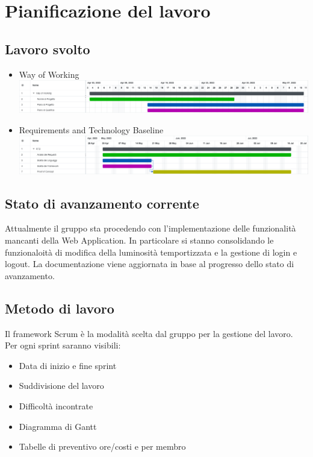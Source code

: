 \documentclass[a4paper, 12pt]{article}
\begin{document}
\newpage
\section{Pianificazione del lavoro}

\subsection{Lavoro svolto}



\begin{itemize}
    \item Way of Working\newline
    \includegraphics[scale=0.24]{WoW_2.png}\newline
    \item Requirements and Technology Baseline\newline
    \includegraphics[scale=0.24]{RTB_9.png}\newline
\end{itemize}

\subsection{Stato di avanzamento corrente}
Attualmente il gruppo sta procedendo con l'implementazione delle funzionalità mancanti della Web Application. In particolare si stanno consolidando le funzionaloità di modifica della luminosità temportizzata e la gestione di login e logout.
La documentazione viene aggiornata in base al progresso dello stato di avanzamento.

\subsection{Metodo di lavoro}
Il framework Scrum è la modalità scelta dal gruppo per la gestione del lavoro.
Per ogni sprint saranno visibili:
\begin{itemize}
	\item Data di inizio e fine sprint
	\item Suddivisione del lavoro
	\item Difficoltà incontrate
	\item Diagramma di Gantt
	\item Tabelle di preventivo ore/costi e per membro
\end{itemize}
\end{document}
